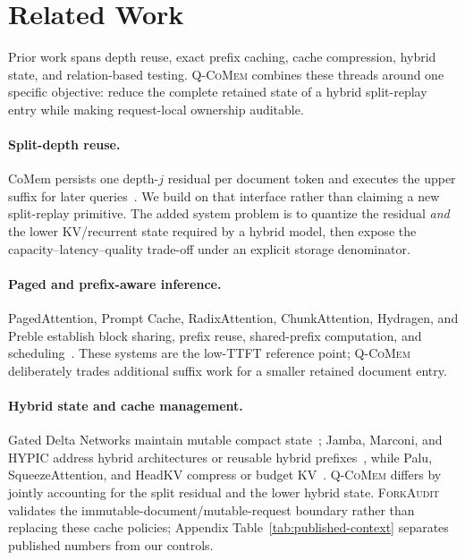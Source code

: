 \documentclass{article}
\newcommand{\qcomem}{\textsc{Q-CoMem}}
\newcommand{\method}{\textsc{ForkAudit}}
\begin{document}
\section{Related Work}
\label{sec:related}

Prior work spans depth reuse, exact prefix caching, cache compression, hybrid
state, and relation-based testing.  \qcomem{} combines these threads around one
specific objective: reduce the complete retained state of a hybrid split-replay
entry while making request-local ownership auditable.

\paragraph{Split-depth reuse.}
CoMem persists one depth-$j$ residual per document token and executes the upper
suffix for later queries~\citep{liu2026comem,liu2026understanding}.  We build on
that interface rather than claiming a new split-replay primitive.  The added
system problem is to quantize the residual \emph{and} the lower KV/recurrent
state required by a hybrid model, then expose the capacity--latency--quality
trade-off under an explicit storage denominator.

\paragraph{Paged and prefix-aware inference.}
PagedAttention, Prompt Cache, RadixAttention, ChunkAttention, Hydragen, and
Preble establish block sharing, prefix reuse, shared-prefix computation, and
scheduling~\citep{kwon2023pagedattention,gim2024promptcache,zheng2024sglang,
ye2024chunkattention,juravsky2024hydragen,srivatsa2025preble}.  These systems
are the low-TTFT reference point; \qcomem{} deliberately trades additional
suffix work for a smaller retained document entry.

\paragraph{Hybrid state and cache management.}
Gated Delta Networks maintain mutable compact state~\citep{yang2025gateddeltanet};
Jamba, Marconi, and HYPIC address hybrid architectures or reusable hybrid
prefixes~\citep{lieber2025jamba,pan2025marconi,liu2026hypic}, while Palu,
SqueezeAttention, and HeadKV compress or budget KV~\citep{chang2025palu,
wang2025squeezeattention,fu2025headkv}.  \qcomem{} differs by jointly accounting
for the split residual and the lower hybrid state.  \method{} validates the
immutable-document/mutable-request boundary rather than replacing these cache
policies; Appendix
Table~\ref{tab:published-context} separates published numbers from our controls.
\end{document}
